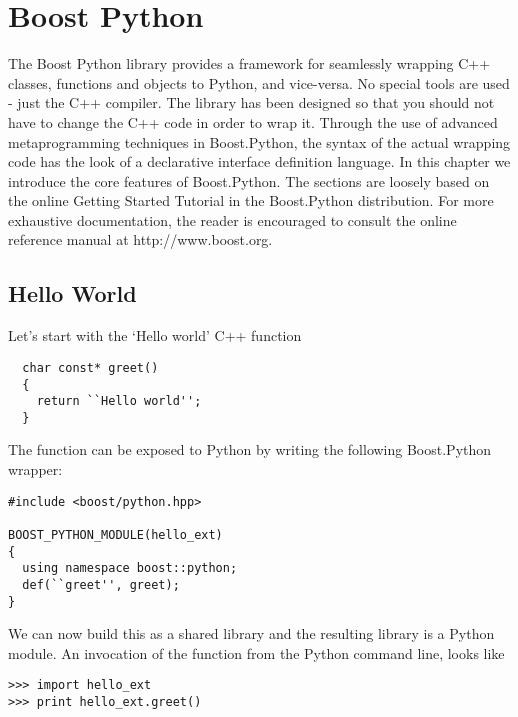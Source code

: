 \chapter{Boost Python} \label{appendix:boost-python}
The Boost Python library provides a framework for seamlessly wrapping C++ classes, functions and objects to Python, and vice-versa. No special tools are used - just the C++ compiler. The library has been designed so that you should not have to change the C++ code in order to wrap it. Through the use of advanced metaprogramming techniques in Boost.Python, the syntax of the actual wrapping code has the look of a declarative interface definition language. In this chapter we introduce the core features of Boost.Python. The sections are loosely based on the online Getting Started Tutorial in the Boost.Python distribution. For more exhaustive documentation, the reader is encouraged to consult the online reference manual at http://www.boost.org.

\section{Hello World}
Let's start with the `Hello world' C++ function
\begin{verbatim}
  char const* greet()
  {
    return ``Hello world'';
  }
\end{verbatim}
The function can be exposed to Python by writing the following Boost.Python wrapper:
\begin{verbatim}
#include <boost/python.hpp>

BOOST_PYTHON_MODULE(hello_ext)
{
  using namespace boost::python;
  def(``greet'', greet);
}
\end{verbatim}
We can now build this as a shared library and the resulting library is a Python module. An invocation of the function from the Python command line, looks like
\begin{verbatim}
>>> import hello_ext
>>> print hello_ext.greet()
\end{verbatim}

